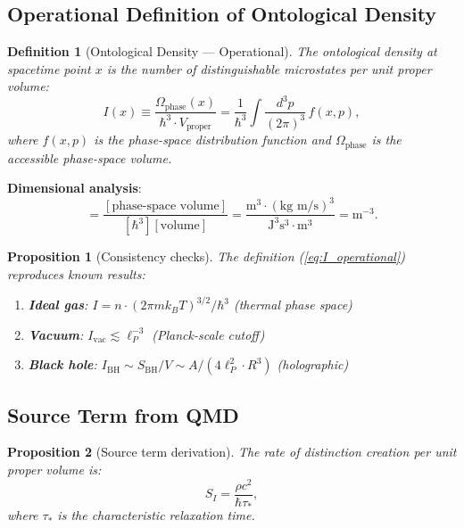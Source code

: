 \documentclass[12pt, a4paper]{article}
\newtheorem{definition}{Definition}
\newtheorem{proposition}{Proposition}
\begin{document}
\subsection{Operational Definition of Ontological Density}

\begin{definition}[Ontological Density --- Operational]
The ontological density at spacetime point $x$ is the number of distinguishable microstates per unit proper volume:
\begin{equation}
    I(x) \equiv \frac{\Omega_{\text{phase}}(x)}{\hbar^3 \cdot V_{\text{proper}}} 
    = \frac{1}{\hbar^3} \int \frac{d^3p}{(2\pi)^3} \, f(x,p),
    \label{eq:I_operational}
\end{equation}
where $f(x,p)$ is the phase-space distribution function and $\Omega_{\text{phase}}$ is the accessible phase-space volume.
\end{definition}

\textbf{Dimensional analysis}:
\begin{equation}
    [I] = \frac{[\text{phase-space volume}]}{[\hbar^3][\text{volume}]} 
    = \frac{\text{m}^3 \cdot (\text{kg m/s})^3}{\text{J}^3\text{s}^3 \cdot \text{m}^3} 
    = \text{m}^{-3}.
\end{equation}

\begin{proposition}[Consistency checks]
The definition (\ref{eq:I_operational}) reproduces known results:
\begin{enumerate}
    \item \textbf{Ideal gas}: $I = n \cdot (2\pi m k_B T)^{3/2}/\hbar^3$ (thermal phase space)
    \item \textbf{Vacuum}: $I_{\text{vac}} \lesssim \ell_P^{-3}$ (Planck-scale cutoff)
    \item \textbf{Black hole}: $I_{\text{BH}} \sim S_{\text{BH}}/V \sim A/(4\ell_P^2 \cdot R^3)$ (holographic)
\end{enumerate}
\end{proposition}

\subsection{Source Term from QMD}

\begin{proposition}[Source term derivation]
The rate of distinction creation per unit proper volume is:
\begin{equation}
    S_I = \frac{\rho c^2}{\hbar \tau_*},
    \label{eq:S_I_derived}
\end{equation}
where $\tau_*$ is the characteristic relaxation time.
\end{proposition}
\end{document}
